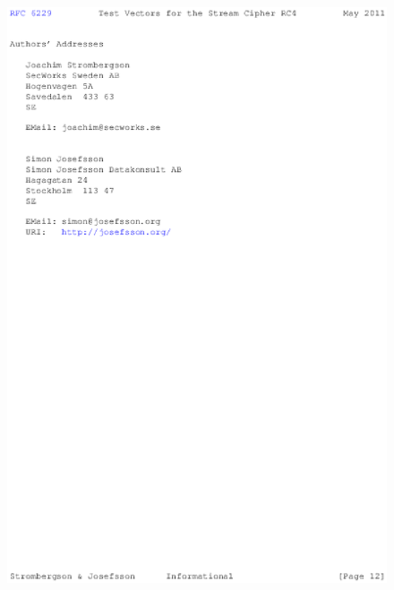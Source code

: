 \begin{anexosenv}
\begin{figure}
\centering
\includegraphics{figuras/file-11}
\end{figure}

\end{anexosenv}